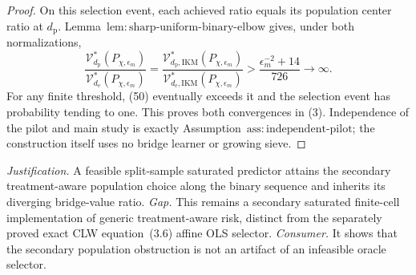 \documentclass{article}
\begin{document}
\begin{proof}
On this selection event, each achieved ratio equals its population center ratio at \(d_{\mathrm p}\).  Lemma~\(\mathrm{lem{:}sharp\text{-}uniform\text{-}binary\text{-}elbow}\) gives, under both normalizations,
\[
 \frac{\mathcal V_{d_{\mathrm p}}^*(P_{\chi,\epsilon_m})}
 {\mathcal V_{d_{\mathrm e}}^*(P_{\chi,\epsilon_m})}
 =\frac{\mathcal V_{d_{\mathrm p},\mathrm{IKM}}^*(P_{\chi,\epsilon_m})}
 {\mathcal V_{d_{\mathrm e},\mathrm{IKM}}^*(P_{\chi,\epsilon_m})}
 >\frac{\epsilon_m^{-2}+14}{726}\longrightarrow\infty.  \tag{50}
\]
For any finite threshold, (50) eventually exceeds it and the selection event has probability tending to one.  This proves both convergences in (3).  Independence of the pilot and main study is exactly Assumption~\(\mathrm{ass{:}independent\text{-}pilot}\); the construction itself uses no bridge learner or growing sieve.
\end{proof}
\par\smallskip\noindent \textit{Justification.} A feasible split-sample saturated predictor attains the secondary treatment-aware population choice along the binary sequence and inherits its diverging bridge-value ratio. \textit{Gap.} This remains a secondary saturated finite-cell implementation of generic treatment-aware risk, distinct from the separately proved exact CLW equation~(3.6) affine OLS selector. \textit{Consumer.} It shows that the secondary population obstruction is not an artifact of an infeasible oracle selector.
\end{document}
